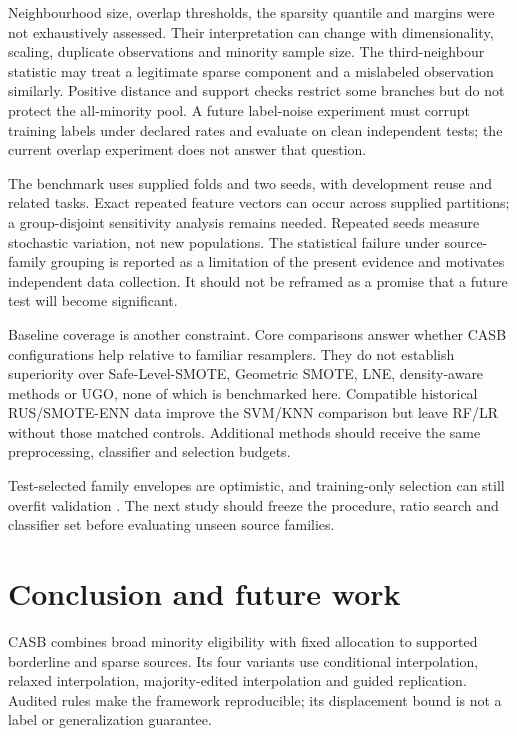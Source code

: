 \documentclass[conference]{IEEEtran}
\begin{document}
Neighbourhood size, overlap thresholds, the sparsity quantile and margins were not exhaustively assessed. Their interpretation can change with dimensionality, scaling, duplicate observations and minority sample size. The third-neighbour statistic may treat a legitimate sparse component and a mislabeled observation similarly. Positive distance and support checks restrict some branches but do not protect the all-minority pool. A future label-noise experiment must corrupt training labels under declared rates and evaluate on clean independent tests; the current overlap experiment does not answer that question.

The benchmark uses supplied folds and two seeds, with development reuse and related tasks. Exact repeated feature vectors can occur across supplied partitions; a group-disjoint sensitivity analysis remains needed. Repeated seeds measure stochastic variation, not new populations. The statistical failure under source-family grouping is reported as a limitation of the present evidence and motivates independent data collection. It should not be reframed as a promise that a future test will become significant.

Baseline coverage is another constraint. Core comparisons answer whether CASB configurations help relative to familiar resamplers. They do not establish superiority over Safe-Level-SMOTE, Geometric SMOTE, LNE, density-aware methods or UGO, none of which is benchmarked here. Compatible historical RUS/SMOTE-ENN data improve the SVM/KNN comparison but leave RF/LR without those matched controls. Additional methods should receive the same preprocessing, classifier and selection budgets.

Test-selected family envelopes are optimistic, and training-only selection can still overfit validation \citep{cawley2010}. The next study should freeze the procedure, ratio search and classifier set before evaluating unseen source families.

\FloatBarrier
\section{Conclusion and future work}
CASB combines broad minority eligibility with fixed allocation to supported borderline and sparse sources. Its four variants use conditional interpolation, relaxed interpolation, majority-edited interpolation and guided replication. Audited rules make the framework reproducible; its displacement bound is not a label or generalization guarantee.
\end{document}
